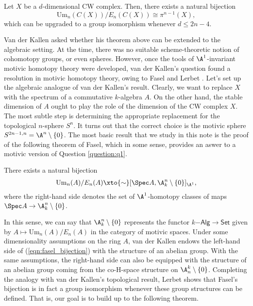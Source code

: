 \begin{theorem}\label{thm:vdk}
    Let $X$ be a $d$-dimensional CW complex. Then, there exists a natural bijection \[
\mathrm{Um}_n(C(X))/E_n(C(X)) \cong \pi^{n-1}(X),
\]
which can be upgraded to a group isomorphism whenever $d \leq 2n-4$.
\end{theorem}

Van der Kallen asked whether his theorem above can be extended to the algebraic setting. At the time, there was no suitable scheme-theoretic notion of cohomotopy groups, or even spheres. However, once the tools of $\A^1$-invariant motivic homotopy theory were developed, van der Kallen's question found a resolution in motivic homotopy theory, owing to Fasel \cite{Fasel_2010} and Lerbet \cite{LERBET2024109415}. Let's set up the algebraic analogue of van der Kallen's result. Clearly, we want to replace $X$ with the spectrum of a commutative $k$-algebra $A$. On the other hand, the stable dimension of $A$ ought to play the role of the dimension of the CW complex $X$. The most subtle step is determining the appropriate replacement for the topological $n$-sphere $S^n$. It turns out that the correct choice is the motivic sphere $S^{2n-1,n} = \A^n \setminus \{0\}$. The most basic result that we study in this note is the proof of the following theorem of Fasel, which in some sense, provides an aswer to a motivic version of Question \ref{question:q1}.

\begin{theorem}[Fasel, 2010]\label{thm:fasel}
    There exists a natural bijection
    \begin{align}\label{eqn:fasel_bijection}\mathrm{Um}_n(A)/E_n(A) \xto{\sim} [\Spec A, \A^n_k\setminus \{0\}]_{\A^1},\end{align} 
    where the right-hand side denotes the set of $\A^1$-homotopy classes of maps $\Spec A \to \A^n_k \setminus\{0\}$.
\end{theorem}

In this sense, we can say that $\A^n_k \setminus\{0\}$ represents the functor $k\mathsf{-Alg} \to \mathsf{Set}$ given by $A \mapsto \mathrm{Um}_n(A)/E_n(A)$ in the category of motivic spaces. Under some dimensionality assumptions on the ring $A$, van der Kallen endows the left-hand side of (\ref{eqn:fasel_bijection}) with the structure of an abelian group. With the same assumptions, the right-hand side can also be equipped with the structure of an abelian group coming from the co-H-space structure on $\A_n^k\setminus\{0\}$. Completing the analogy with van der Kallen's topological result, Lerbet \cite{LERBET2024109415} shows that Fasel's bijection is in fact a group isomorphism whenever these group structures can be defined. That is, our goal is to build up to the following theorem.

